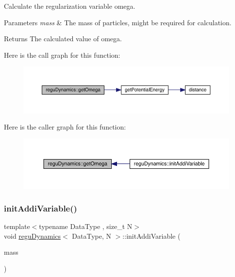 Calculate the regularization variable omega. 


\begin{DoxyParams}{Parameters}
{\em mass} & The mass of particles, might be required for calculation. \\
\hline
\end{DoxyParams}
\begin{DoxyReturn}{Returns}
The calculated value of omega. 
\end{DoxyReturn}
Here is the call graph for this function\+:\nopagebreak
\begin{figure}[H]
\begin{center}
\leavevmode
\includegraphics[width=350pt]{classregu_dynamics_a0fe3b4f9a468687ec1f004120b347ddd_cgraph}
\end{center}
\end{figure}
Here is the caller graph for this function\+:\nopagebreak
\begin{figure}[H]
\begin{center}
\leavevmode
\includegraphics[width=350pt]{classregu_dynamics_a0fe3b4f9a468687ec1f004120b347ddd_icgraph}
\end{center}
\end{figure}
\mbox{\label{classregu_dynamics_aa42158ddf3c5385aa89988b9bb80ff29}} 
\subsubsection{\texorpdfstring{init\+Addi\+Variable()}{initAddiVariable()}}
{\footnotesize\ttfamily template$<$typename Data\+Type , size\+\_\+t N$>$ \\
void \mbox{\hyperlink{classregu_dynamics}{regu\+Dynamics}}$<$ Data\+Type, N $>$\+::init\+Addi\+Variable (\begin{DoxyParamCaption}\item[{\mbox{\hyperlink{classregu_dynamics_a34b4b77ea3e49e1cdef584ec8bd281dc}{Scalar\+Array}} \&}]{mass }\end{DoxyParamCaption})\hspace{0.3cm}{\ttfamily [inline]}}



